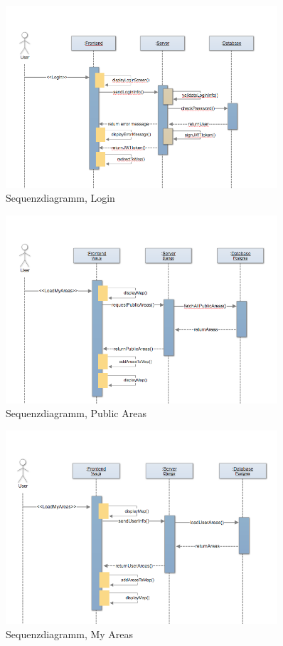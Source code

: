 \begin{figure}[h]
\centering
    \includegraphics[width=0.9\textwidth]{Sequenz_DiagrammLogin}
    \caption{Sequenzdiagramm, Login}
    \label{fig:sd2}
\end{figure}

\begin{figure}[h]
\centering
    \includegraphics[width=0.9\textwidth]{Sequenz_DiagrammPublicAreas}
    \caption{Sequenzdiagramm, Public Areas}
    \label{fig:sd3}
\end{figure}

\begin{figure}[h]
\centering
    \includegraphics[width=0.9\textwidth]{Sequenz_DiagrammMyAreas}
    \caption{Sequenzdiagramm, My Areas}
    \label{fig:sd4}
\end{figure}


